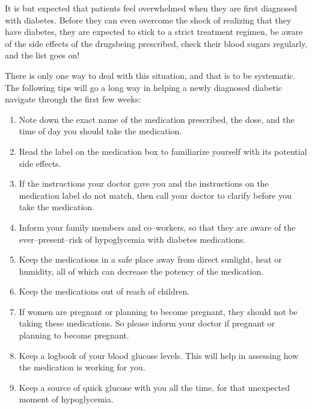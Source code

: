 
It is but expected that patients feel overwhelmed when they are first diagnosed with diabetes. Before they can even overcome the shock of realizing that they have diabetes, they are expected to stick to a strict treatment regimen, be aware of the side effects of the drugs\break being prescribed, check their blood sugars regularly, and the list goes on!

There is only one way to deal with this situation, and that is to be systematic. The following tips will go a long way in helping a newly diagnosed diabetic navigate through the first few weeks:

\vspace{-\topsep}
\begin{enumerate}[•]
\itemsep=0pt
\item Note down the exact name of the medication prescribed, the dose, and the time of day you should take the medication.
\item Read the label on the medication box to familiarize yourself with its potential side effects.
\item If the instructions your doctor gave you and the instructions on the medication label do not match, then call your doctor to clarify before you take the medication.
\item Inform your family members and co–workers, so that they are aware of the ever–present–risk of hypoglycemia with diabetes medications.
\item Keep the medications in a safe place away from direct sunlight, heat or humidity, all of which can decrease the potency of the medication.
\item Keep the medications out of reach of children.
\item If women are pregnant or planning to become pregnant, they should not be taking these medications. So please inform your doctor if pregnant or planning to become pregnant.
\item Keep a logbook of your blood glucose levels. This will help in asse\-ssing how the medication is working for you.
\item Keep a source of quick glucose with you all the time, for that un\-expected moment of hypoglycemia.
\end{enumerate}
\vspace{-\topsep}


